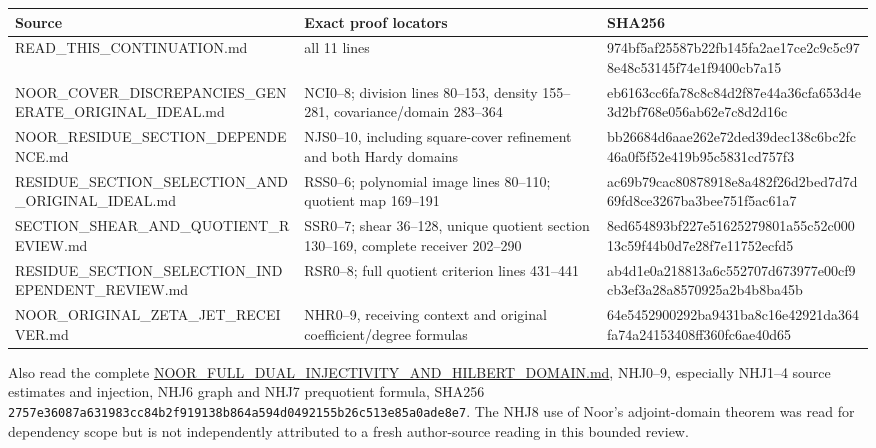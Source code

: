 \documentclass[
]{article}
\newcounter{none} %
\begin{document}
{\def\LTcaptype{none} %
\begin{longtable}[]{@{}
  >{\raggedright\arraybackslash}p{}
  >{\raggedright\arraybackslash}p{}
  >{\raggedright\arraybackslash}p{}@{}}
\toprule\noalign{}
\begin{minipage}[b]{\linewidth}\raggedright
Source
\end{minipage} & \begin{minipage}[b]{\linewidth}\raggedright
Exact proof locators
\end{minipage} & \begin{minipage}[b]{\linewidth}\raggedright
SHA256
\end{minipage} \\
\midrule\noalign{}
\endhead
\bottomrule\noalign{}
\endlastfoot
READ\_THIS\_CONTINUATION.md & all 11 lines & 974bf5af25587b22fb145fa2ae17ce2c9c5c978e48c53145f74e1f9400cb7a15 \\
NOOR\_COVER\_DISCREPANCIES\_GENERATE\_ORIGINAL\_IDEAL.md & NCI0--8; division lines 80--153, density 155--281, covariance/domain 283--364 & eb6163cc6fa78c8c84d2f87e44a36cfa653d4e3d2bf768e056ab62e7c8d2d16c \\
NOOR\_RESIDUE\_SECTION\_DEPENDENCE.md & NJS0--10, including square-cover refinement and both Hardy domains & bb26684d6aae262e72ded39dec138c6bc2fc46a0f5f52e419b95c5831cd757f3 \\
RESIDUE\_SECTION\_SELECTION\_AND\_ORIGINAL\_IDEAL.md & RSS0--6; polynomial image lines 80--110; quotient map 169--191 & ac69b79cac80878918e8a482f26d2bed7d7d69fd8ce3267ba3bee751f5ac61a7 \\
SECTION\_SHEAR\_AND\_QUOTIENT\_REVIEW.md & SSR0--7; shear 36--128, unique quotient section 130--169, complete receiver 202--290 & 8ed654893bf227e51625279801a55c52c00013c59f44b0d7e28f7e11752ecfd5 \\
RESIDUE\_SECTION\_SELECTION\_INDEPENDENT\_REVIEW.md & RSR0--8; full quotient criterion lines 431--441 & ab4d1e0a218813a6c552707d673977e00cf9cb3ef3a28a8570925a2b4b8ba45b \\
NOOR\_ORIGINAL\_ZETA\_JET\_RECEIVER.md & NHR0--9, receiving context and original coefficient/degree formulas & 64e5452900292ba9431ba8c16e42921da364fa74a24153408ff360fc6ae40d65 \\
\end{longtable}
}

Also read the complete \href{https://github.com/KokunoYumeto/zeta-function-research-reader/blob/main/workbenches/splitzero-tandem/continuations/20260925-source-endpoint-and-section/NOOR_FULL_DUAL_INJECTIVITY_AND_HILBERT_DOMAIN.md}{NOOR\_FULL\_DUAL\_INJECTIVITY\_AND\_HILBERT\_DOMAIN.md}, NHJ0--9, especially NHJ1--4 source estimates and injection, NHJ6 graph and NHJ7 prequotient formula, SHA256 \texttt{2757e36087a631983cc84b2f919138b864a594d0492155b26c513e85a0ade8e7}. The NHJ8 use of Noor's adjoint-domain theorem was read for dependency scope but is not independently attributed to a fresh author-source reading in this bounded review.
\end{document}
